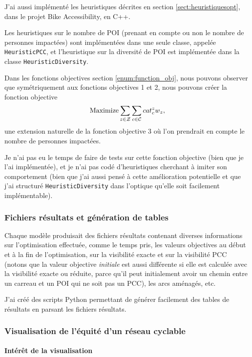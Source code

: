 J'ai aussi implémenté les heuristiques décrites en section \ref{sect:heuristiquesopt}, dans le projet Bike Accessibility, en C++. 

Les heuristiques sur le nombre de POI (prenant en compte ou non le nombre de personnes impactées) sont implémentées dans une seule classe, appelée \verb|HeuristicPCC|, et l'heuristique sur la diversité de POI est implémentée dans la classe \verb|HeuristicDiversity|.

Dans les fonctions objectives section \ref{enum:function_obj}, nous pouvons observer que symétriquement aux fonctions objectives 1 et 2, nous pouvons créer la fonction objective 
$$\operatorname{Maximize} \sum_{z \in \mathcal{Z} } \sum_{c \in \mathcal{C}} cat_c^z w_z,$$ une extension naturelle de la fonction objective 3 où l'on prendrait en compte le nombre de personnes impactées.

Je n'ai pas eu le temps de faire de tests sur cette fonction objective (bien que je l'ai implémentée), et je n'ai pas codé d'heuristiques cherchant à imiter son comportement (bien que j'ai aussi pensé à cette amélioration potentielle et que j'ai structuré \verb|HeuristicDiversity| dans l'optique qu'elle soit facilement implémentable).

\subsubsection{Fichiers résultats et génération de tables}

Chaque modèle produisait des fichiers résultats contenant diverses informations sur l'optimisation effectuée, comme le temps pris, les valeurs objectives au début et à la fin de l'optimisation, sur la visibilité exacte et sur la visibilité PCC (notons que la valeur objective \emph{initiale} est aussi différente si elle est calculée avec la visibilité exacte ou réduite, parce qu'il peut initialement avoir un chemin entre un carreau et un POI qui ne soit pas un PCC), les arcs aménagés, etc.

J'ai créé des scripts Python permettant de générer facilement des tables de résultats en parsant les fichiers résultats. 


\subsubsection{Visualisation de l'équité d'un réseau cyclable}

\paragraph{Intérêt de la visualisation}

